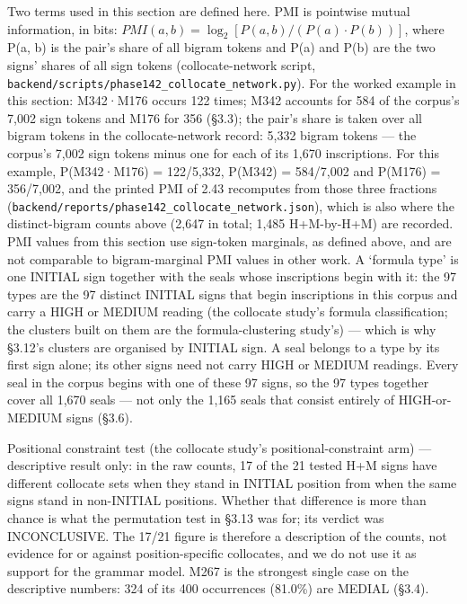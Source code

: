 \documentclass[11pt]{article}
\begin{document}
Two terms used in this section are defined here. PMI is pointwise mutual information, in bits: $PMI(a, b) = \log_2 [ P(a, b) / (P(a) \cdot P(b)) ]$, where P(a, b) is the pair's share of all bigram tokens and P(a) and P(b) are the two signs' shares of all sign tokens (collocate-network script, \texttt{backend/scripts/phase142\_collocate\_network.py}). For the worked example in this section: M342·M176 occurs 122 times; M342 accounts for 584 of the corpus's 7,002 sign tokens and M176 for 356 (§3.3); the pair's share is taken over all bigram tokens in the collocate-network record: 5,332 bigram tokens --- the corpus's 7,002 sign tokens minus one for each of its 1,670 inscriptions. For this example, P(M342·M176) = 122/5,332, P(M342) = 584/7,002 and P(M176) = 356/7,002, and the printed PMI of 2.43 recomputes from those three fractions (\texttt{backend/reports/phase142\_collocate\_network.json}), which is also where the distinct-bigram counts above (2,647 in total; 1,485 H+M-by-H+M) are recorded. PMI values from this section use sign-token marginals, as defined above, and are not comparable to bigram-marginal PMI values in other work. A `formula type' is one INITIAL sign together with the seals whose inscriptions begin with it: the 97 types are the 97 distinct INITIAL signs that begin inscriptions in this corpus and carry a HIGH or MEDIUM reading (the collocate study's formula classification; the clusters built on them are the formula-clustering study's) --- which is why §3.12's clusters are organised by INITIAL sign. A seal belongs to a type by its first sign alone; its other signs need not carry HIGH or MEDIUM readings. Every seal in the corpus begins with one of these 97 signs, so the 97 types together cover all 1,670 seals --- not only the 1,165 seals that consist entirely of HIGH-or-MEDIUM signs (§3.6).

Positional constraint test (the collocate study's positional-constraint arm) --- descriptive result only: in the raw counts, 17 of the 21 tested H+M signs have different collocate sets when they stand in INITIAL position from when the same signs stand in non-INITIAL positions. Whether that difference is more than chance is what the permutation test in §3.13 was for; its verdict was INCONCLUSIVE. The 17/21 figure is therefore a description of the counts, not evidence for or against position-specific collocates, and we do not use it as support for the grammar model. M267 is the strongest single case on the descriptive numbers: 324 of its 400 occurrences (81.0\%) are MEDIAL (§3.4).
\end{document}

